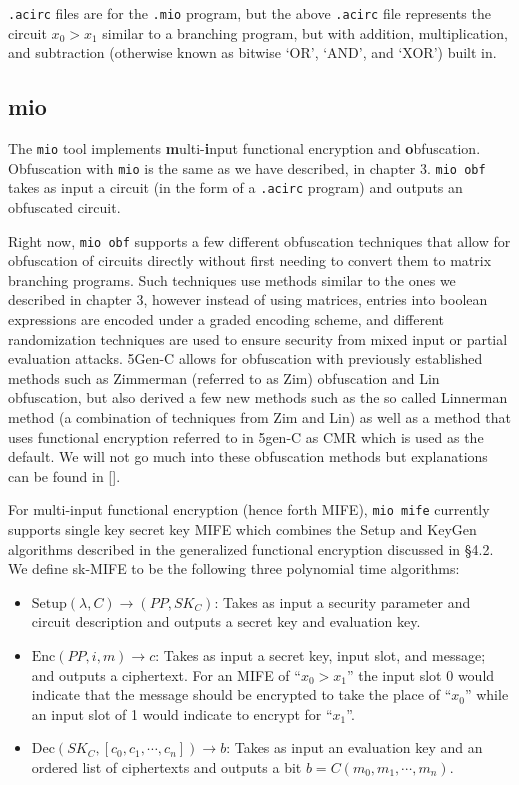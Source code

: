 \documentclass[12pt,twoside]{reedthesis}
\newcommand{\enc}[0]{\text{Enc}}
\newcommand{\dec}[0]{\text{Dec}}
\begin{document}
   \texttt{.acirc} files are for the \texttt{.mio} program, but the above \texttt{.acirc} file represents the circuit $x_0 > x_1$ similar to a branching program, but with addition, multiplication, and subtraction (otherwise known as bitwise `OR', `AND', and `XOR') built in.          
         
          \subsection{mio}
    \par The \texttt{mio} tool implements \textbf{m}ulti-\textbf{i}nput functional encryption and \textbf{o}bfuscation. Obfuscation with \texttt{mio} is the same as we have described, in chapter 3. \texttt{mio obf} takes as input a circuit (in the form of a \texttt{.acirc} program) and outputs an obfuscated circuit.
    \par Right now, \texttt{mio obf} supports a few different obfuscation techniques that allow for obfuscation of circuits directly without first needing to convert them to matrix branching programs. Such techniques use methods similar to the ones we described in chapter 3, however instead of using matrices, entries into boolean expressions are encoded under a graded encoding scheme, and different randomization techniques are used to ensure security from mixed input or partial evaluation attacks. 5Gen-C allows for obfuscation with previously established methods such as Zimmerman (referred to as Zim) obfuscation and Lin obfuscation, but also derived a few new methods such as the so called Linnerman method (a combination of techniques from Zim and Lin) as well as a method that uses functional encryption referred to in 5gen-C as CMR which is used as the default. We will not go much into these obfuscation methods but explanations can be found in [\cite{5genc}].
    \par For multi-input functional encryption (hence forth MIFE), \texttt{mio mife} currently supports single key secret key MIFE which combines the Setup and KeyGen algorithms described in the generalized functional encryption discussed in \S 4.2. We define sk-MIFE to be the following three polynomial time algorithms:
    \begin{itemize}
       \item$ \text{Setup}(\lambda,C) \to (PP,SK_C)$:
        Takes as input a security parameter and circuit description and outputs a secret key and evaluation key. 
        \item $\enc(PP,i,m) \to c$:
        Takes as input a secret key, input slot, and message; and outputs a ciphertext. For an MIFE of ``$x_0>x_1$'' the input slot 0 would indicate that the message should be encrypted to take the place of ``$x_0$'' while an input slot of 1 would indicate to encrypt for ``$x_1$''.    
        \item $\dec(SK_C,[c_0,c_1,\cdots,c_n]) \to b$:
        Takes as input an evaluation key and an ordered list of ciphertexts and outputs a bit $b = C(m_0,m_1,\cdots,m_n)$.
        \end{itemize}
\end{document}
